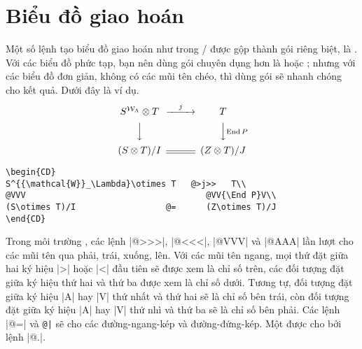 \documentclass[11pt,leqno,titlepage,openany]{amsldoc}[1999/12/13]
\DeclareMathOperator{\End}{End}
\begin{document}
\chapter{Biểu đồ giao hoán}\label{s:commdiag}

Một số lệnh tạo biểu đồ giao hoán như trong \amstex/ được gộp thành 
gói riêng biệt, là . Với các biểu đồ phức tạp, bạn nên dùng gói
chuyên dụng hơn là  hoặc ; nhưng với các biểu đồ
đơn giản, không có các mũi tên chéo, thì dùng gói  sẽ nhanh
chóng cho kết quả. Dưới đây là ví dụ.
\begin{equation*}
\begin{CD}
S^{{\mathcal{W}}_\Lambda}\otimes T   @>j>>   T\\
@VVV                                    @VV{\End P}V\\
(S\otimes T)/I                  @=      (Z\otimes T)/J
\end{CD}
\end{equation*}
\begin{verbatim}
\begin{CD}
S^{{\mathcal{W}}_\Lambda}\otimes T   @>j>>   T\\
@VVV                                    @VV{\End P}V\\
(S\otimes T)/I                  @=      (Z\otimes T)/J
\end{CD}
\end{verbatim}
Trong môi trường , các lệnh |@>>>|, |@<<<|, |@VVV| và |@AAA|
lần lượt cho các mũi tên qua phải, trái, xuống, lên. Với các mũi tên ngang,
mọi thứ đặt giữa hai ký hiệu |>| hoặc |<| đầu tiên sẽ được xem là chỉ số trên,
các đối tượng đặt giữa ký hiệu thứ hai và thứ ba được xem là chỉ số dưới.
Tương tự, đối tượng đặt giữa ký hiệu |A| hay |V| thứ nhất và thứ hai
sẽ là chỉ số bên trái, còn đối tượng đặt giữa ký hiệu |A| hay |V| thứ nhì và
thứ ba sẽ là chỉ số bên phải. Các lệnh |@=| và \verb'@|'
sẽ cho các đường-ngang-kép và đường-đứng-kép. Một 
được cho bởi lệnh |@.|.
\end{document}
